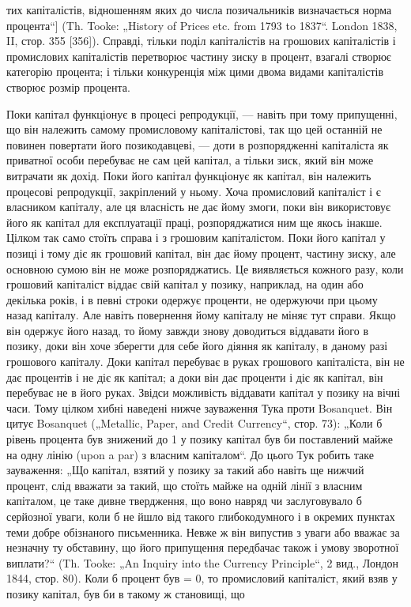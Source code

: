 тих капіталістів, відношенням яких до числа позичальників визначається
норма процента“] (Th. Tooke: „History of Prices etc.
from 1793 to 1837“. London 1838, II, стор. 355 [356]). Справді, тільки
поділ капіталістів на грошових капіталістів і промислових капіталістів
перетворює частину зиску в процент, взагалі створює
категорію процента; і тільки конкуренція між цими двома видами
капіталістів створює розмір процента.

Поки капітал функціонує в процесі репродукції, — навіть при
тому припущенні, що він належить самому промисловому капіталістові,
так що цей останній не повинен повертати його позикодавцеві,
— доти в розпорядженні капіталіста як приватної
особи перебуває не сам цей капітал, а тільки зиск, який він
може витрачати як дохід. Поки його капітал функціонує як
капітал, він належить процесові репродукції, закріплений у ньому.
Хоча промисловий капіталіст і є власником капіталу, але ця власність
не дає йому змоги, поки він використовує його як капітал
для експлуатації праці, розпоряджатися ним ще якось інакше.
Цілком так само стоїть справа і з грошовим капіталістом. Поки
його капітал у позиці і тому діє як грошовий капітал, він
дає йому процент, частину зиску, але основною сумою він не
може розпоряджатись. Це виявляється кожного разу, коли грошовий
капіталіст віддає свій капітал у позику, наприклад, на
один або декілька років, і в певні строки одержує проценти,
не одержуючи при цьому назад капіталу. Але навіть повернення
йому капіталу не міняє тут справи. Якщо він одержує
його назад, то йому завжди знову доводиться віддавати його
в позику, доки він хоче зберегти для себе його діяння як
капіталу, в даному разі грошового капіталу. Доки капітал
перебуває в руках грошового капіталіста, він не дає процентів
і не діє як капітал; а доки він дає проценти і діє як капітал,
він перебуває не в його руках. Звідси можливість
віддавати капітал у позику на вічні часи. Тому цілком хибні
наведені нижче зауваження Тука проти Bosanquet. Він цитує
Bosanquet („Metallic, Paper, and Credit Currency“, стор. 73):
„Коли б рівень процента був знижений до 1%
у позику капітал був би поставлений майже на одну лінію (upon
a par) з власним капіталом“. До цього Тук робить таке зауваження:
„Що капітал, взятий у позику за такий або навіть ще
нижчий процент, слід вважати за такий, що стоїть майже на
одній лінії з власним капіталом, це таке дивне твердження, що
воно навряд чи заслуговувало б серйозної уваги, коли б не
йшло від такого глибокодумного і в окремих пунктах теми
добре обізнаного письменника. Невже ж він випустив з уваги
або вважає за незначну ту обставину, що його припущення
передбачає також і умову зворотної виплати?“ (Th. Tooke: „An
Inquiry into the Currency Principle“, 2 вид., Лондон 1844,
стор. 80). Коли б процент був = 0, то промисловий капіталіст,
який взяв у позику капітал, був би в такому ж становищі, що
